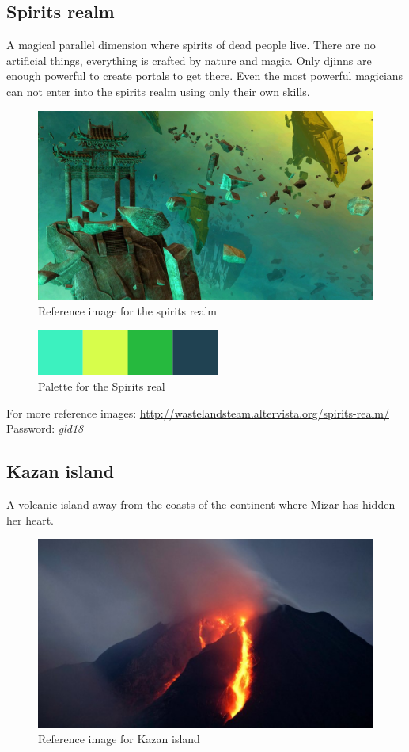 \subsection{Spirits realm}
A magical parallel dimension where spirits of dead people live. There are no artificial things, everything is crafted by nature and magic. Only djinns are enough powerful to create portals to get there. Even the most powerful magicians can not enter into the spirits realm using only their own skills.
\begin{figure}[H]
  \centering
  \includegraphics[width=12cm]{../Images/Locations/spiritsRealm}
  \caption{Reference image for the spirits realm}
\end{figure}

\begin{figure}[H]
  \centering
  \includegraphics[width=6cm]{Images/Palettes/spiritsRealm}
  \caption{Palette for the Spirits real}
\end{figure}

For more reference images: \url{http://wastelandsteam.altervista.org/spirits-realm/} \\
Password: \textit{gld18}

\pagebreak

\subsection{Kazan island}
A volcanic island away from the coasts of the continent where Mizar has hidden her heart.
\begin{figure}[H]
  \centering
  \includegraphics[width=12cm]{../Images/Locations/kazanIsland}
  \caption{Reference image for Kazan island}
\end{figure}

